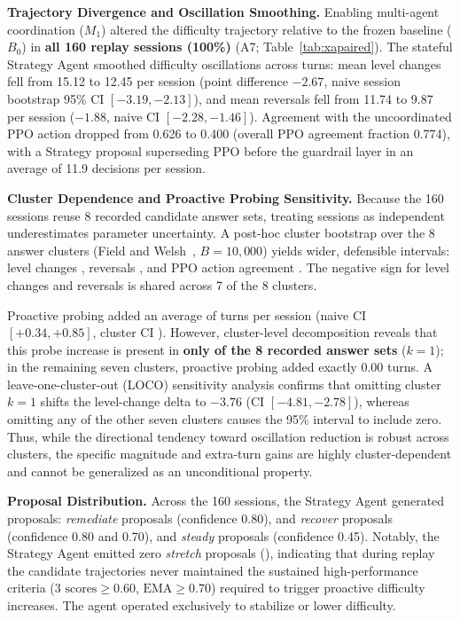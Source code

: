 \noindent\textbf{Trajectory Divergence and Oscillation Smoothing.} Enabling multi-agent coordination ($M_1$) altered the difficulty trajectory relative to the frozen baseline ($B_0$) in \textbf{all 160 replay sessions (100\%)} (A7; Table~\ref{tab:xapaired}). The stateful Strategy Agent smoothed difficulty oscillations across turns: mean level changes fell from 15.12 to 12.45 per session (point difference $-2.67$, naive session bootstrap 95\% CI $[-3.19, -2.13]$), and mean reversals fell from 11.74 to 9.87 per session ($-1.88$, naive CI $[-2.28, -1.46]$). Agreement with the uncoordinated PPO action dropped from 0.626 to 0.400 (overall PPO agreement fraction 0.774), with a Strategy proposal superseding PPO before the guardrail layer in an average of 11.9 decisions per session.

\noindent\textbf{Cluster Dependence and Proactive Probing Sensitivity.} Because the 160 sessions reuse 8 recorded candidate answer sets, treating sessions as independent underestimates parameter uncertainty. A post-hoc cluster bootstrap over the 8 answer clusters (Field and Welsh~\cite{fw07}, $B = 10{,}000$) yields wider, defensible intervals: level changes \phchgmean{} \phchgci{}, reversals \phrevmean{} \phrevci{}, and PPO action agreement \phagrmean{} \phagrci{}. The negative sign for level changes and reversals is shared across 7 of the 8 clusters.

Proactive probing added an average of \phfumean{} turns per session (naive CI $[+0.34, +0.85]$, cluster CI \phfuci{}). However, cluster-level decomposition reveals that this probe increase is present in \textbf{only \phfusame{} of the 8 recorded answer sets} ($k=1$); in the remaining seven clusters, proactive probing added exactly 0.00 turns. A leave-one-cluster-out (LOCO) sensitivity analysis confirms that omitting cluster $k=1$ shifts the level-change delta to $-3.76$ (CI $[-4.81, -2.78]$), whereas omitting any of the other seven clusters causes the 95\% interval to include zero. Thus, while the directional tendency toward oscillation reduction is robust across clusters, the specific magnitude and extra-turn gains are highly cluster-dependent and cannot be generalized as an unconditional property.

\noindent\textbf{Proposal Distribution.} Across the 160 sessions, the Strategy Agent generated \scTotal{} proposals: \scRemEight{} \emph{remediate} proposals (confidence 0.80), \scRecEight{} and \scRecSeven{} \emph{recover} proposals (confidence 0.80 and 0.70), and \scSteady{} \emph{steady} proposals (confidence 0.45). Notably, the Strategy Agent emitted zero \emph{stretch} proposals (\scStretch{}), indicating that during replay the candidate trajectories never maintained the sustained high-performance criteria ($3\text{ scores} \ge 0.60$, $\text{EMA} \ge 0.70$) required to trigger proactive difficulty increases. The agent operated exclusively to stabilize or lower difficulty.

